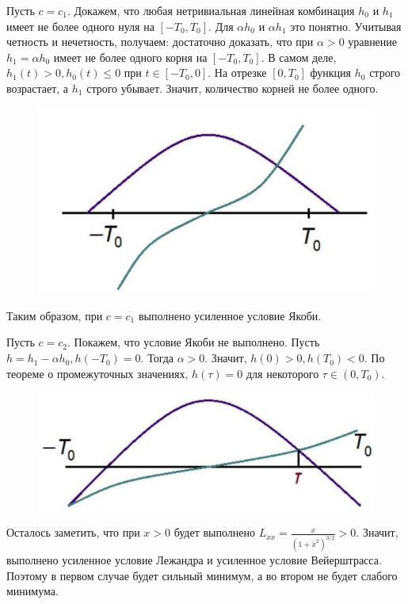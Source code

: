 \begin{task}
    Пусть $c=c_{1}$. Докажем, что любая нетривиальная линейная комбинация $h_{0}$ и $h_{1}$ имеет не более одного нуля на $\left[-T_{0}, T_{0}\right]$. Для $\alpha h_{0}$ и $\alpha h_{1}$ это понятно. Учитывая четность и нечетность, получаем: достаточно доказать, что при $\alpha>0$ уравнение $h_{1}=\alpha h_{0}$ имеет не более одного корня на $\left[-T_{0}, T_{0}\right]$. В самом деле, $h_{1}(t)>0, h_{0}(t) \leq 0$ при $t \in\left[-T_{0}, 0\right]$. На отрезке $\left[0, T_{0}\right]$ функция $h_{0}$ строго возрастает, а $h_{1}$ строго убывает. Значит, количество корней не более одного.
    
    \begin{figure}[h!]
        \centering
        \includegraphics[width=0.99\linewidth]{tasks/task28/pic2.jpg}
    \end{figure}
    
    Таким образом, при $c=c_{1}$ выполнено усиленное условие Якоби.
    
    Пусть $c=c_{2}$. Покажем, что условие Якоби не выполнено. Пусть $h=h_{1}-\alpha h_{0}, h\left(-T_{0}\right)=0$. Тогда $\alpha>0$. Значит, $h(0)>0, h\left(T_{0}\right)<0$. По теореме о промежуточных значениях, $h(\tau)=0$ для некоторого $\tau \in\left(0, T_{0}\right)$.
    
    \begin{figure}[h!]
        \centering
        \includegraphics[width=0.99\linewidth]{tasks/task28/pic3.jpg}
    \end{figure}
    
        
    
    Осталось заметить, что при $x>0$ будет выполнено $L_{\dot{x} \dot{x}}=\frac{x}{\left(1+\dot{x}^{2}\right)^{3 / 2}}>0$. Значит, выполнено усиленное условие Лежандра и усиленное условие Вейерштрасса. Поэтому в первом случае будет сильный минимум, а во втором не будет слабого минимума.

\end{task}